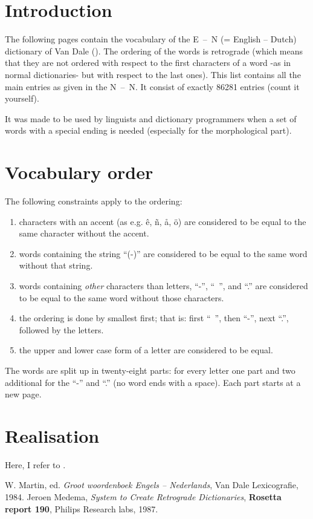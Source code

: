 
   \RosDate{\today}
   \RosSupersedes{-}
   \MakeRosTitle
%
%
\setlength{\parindent}{0mm}
\setlength{\parskip}{2mm}

\section{Introduction}
 The following pages contain the vocabulary of the E~--~N (= English -- Dutch) 
 dictionary of 
 Van Dale (\cite{ma:groot}). The ordering of the words is retrograde (which 
 means that they are not ordered with respect to the first characters of a 
 word -as in normal dictionaries- but with respect to the last ones). 
 This list contains all the main entries as given in the 
 N~--~N. It consist of exactly 86281 entries (count it yourself).

 It was made to be used by linguists and dictionary programmers when a set 
 of words with a special ending is needed (especially for the morphological 
 part). 
\section{Vocabulary order}
 The following constraints apply to the ordering:
 \begin{enumerate}
  \item characters with an accent (as e.g. \^{e}, \~{n}, \aa, \"{o}) are 
  considered to be equal to the same character without the accent.
  \item words containing the string ``(-)'' are considered to be equal to the 
  same word without that string.
  \item words containing {\em other} characters than letters, ``-'', ``~'', and 
  ``.'' are considered to be equal to the same word without those characters.
  \item the ordering is done by smallest first; that is: first ``~'', then 
  ``-'', next ``.'', followed by the letters.
  \item the upper and lower case form of a letter are considered to be equal.
 \end {enumerate}
 The words are split up in twenty-eight parts: for every letter one part and 
 two additional for the ``-'' and ``.'' (no word ends with a space). Each part 
 starts at a new page.
\section{Realisation}
 Here, I refer to \cite{med:crv}.

\begin{thebibliography}{AAA99a}
  W. Martin, ed. {\em Groot woordenboek 
  Engels -- Nederlands}, Van Dale Lexicografie, 1984.
  Jeroen Medema, {\em System to Create Retrograde 
  Dictionaries}, {\bf Rosetta report 190}, Philips Research labs, 1987.
\end{thebibliography}

